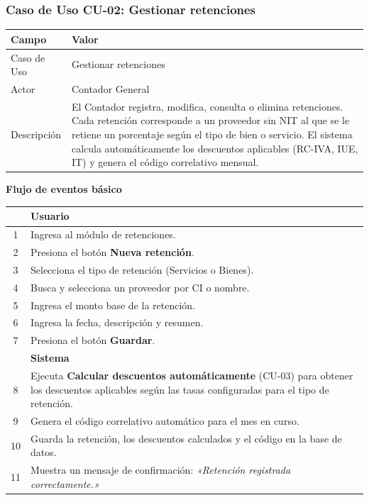 \documentclass[stu]{apa7}
\begin{document}
\subsubsection{Caso de Uso CU-02: Gestionar retenciones}

\begin{tabularx}{\textwidth}{|l|X|}
\hline
\rowcolor[gray]{0.9}
\textbf{Campo} & \textbf{Valor} \\
\hline
Caso de Uso & Gestionar retenciones \\
\hline
Actor & Contador General \\
\hline
Descripción & El Contador registra, modifica, consulta o elimina retenciones. Cada retención corresponde a un proveedor sin NIT al que se le retiene un porcentaje según el tipo de bien o servicio. El sistema calcula automáticamente los descuentos aplicables (RC-IVA, IUE, IT) y genera el código correlativo mensual. \\
\hline
\end{tabularx}

\vspace{0.3cm}

\textbf{Flujo de eventos básico}

\begin{tabularx}{\textwidth}{|c|X|}
\hline
& \textbf{Usuario} \\
\hline
1 & Ingresa al módulo de retenciones. \\
\hline
2 & Presiona el botón \textbf{Nueva retención}. \\
\hline
3 & Selecciona el tipo de retención (Servicios o Bienes). \\
\hline
4 & Busca y selecciona un proveedor por CI o nombre. \\
\hline
5 & Ingresa el monto base de la retención. \\
\hline
6 & Ingresa la fecha, descripción y resumen. \\
\hline
7 & Presiona el botón \textbf{Guardar}. \\
\hline
& \textbf{Sistema} \\
\hline
8 & Ejecuta \textbf{Calcular descuentos automáticamente} (CU-03) para obtener los descuentos aplicables según las tasas configuradas para el tipo de retención. \\
\hline
9 & Genera el código correlativo automático para el mes en curso. \\
\hline
10 & Guarda la retención, los descuentos calculados y el código en la base de datos. \\
\hline
11 & Muestra un mensaje de confirmación: \textit{«Retención registrada correctamente.»} \\
\hline
\end{tabularx}
\end{document}
